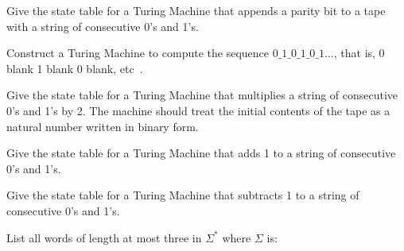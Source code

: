 \begin{questions}
\begin{solution}
\end{solution}


\question
Give the state table for a Turing Machine that appends a parity bit to a tape with a string of consecutive 0's and 1's.

\question
Construct a Turing Machine to compute the sequence $0\_1\_0\_1\_0\_1\ldots$, that is, 0 blank 1 blank 0 blank, etc~\cite{turing}.

\question
Give the state table for a Turing Machine that multiplies a string of consecutive 0's and 1's by 2. The machine should treat the initial contents of the tape as a natural number written in binary form.

\question
Give the state table for a Turing Machine that adds 1 to a string of consecutive 0's and 1's.

\question
Give the state table for a Turing Machine that subtracts 1 to a string of consecutive 0's and 1's.


\question
List all words of length at most three in $\Sigma^*$ where $\Sigma$ is:
\end{questions}
